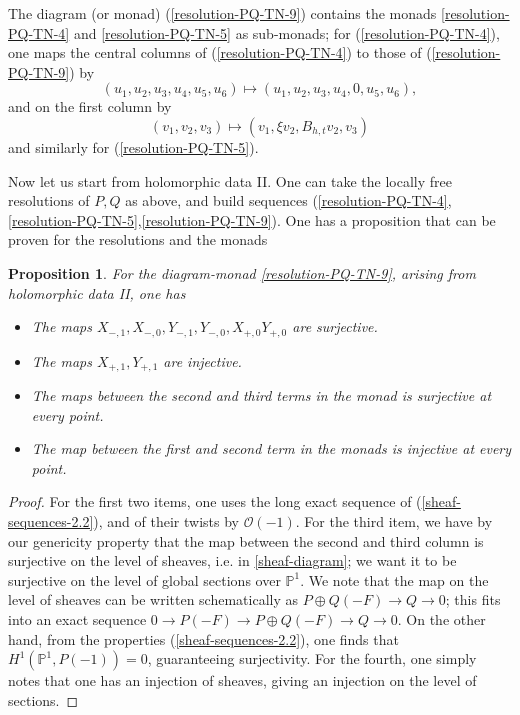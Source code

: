 \documentclass[12pt]{article}
\newtheorem{proposition}[theorem]{Proposition}
\theoremstyle{definition}
\theoremstyle{remark}
\numberwithin{theorem}{section}
\def\bP{{\mathbb {P}}}
\def\pO{{\mathcal O}}
\begin{document}
The diagram (or monad) (\ref{resolution-PQ-TN-9}) contains the monads \eqref{resolution-PQ-TN-4} and \eqref{resolution-PQ-TN-5} as sub-monads; 
for (\ref{resolution-PQ-TN-4}), one maps the central columns of (\ref{resolution-PQ-TN-4}) to those of (\ref{resolution-PQ-TN-9}) by 
$$(u_1, u_2, u_3, u_4,u_5, u_6)\mapsto (u_1, u_2, u_3 , u_4  , 0, u_5, u_6),$$
and on the first column by 
$$(v_1, v_2, v_3) \mapsto (v_1, \xi v_2, B_{h,t}v_2, v_3)$$
and  similarly for (\ref{resolution-PQ-TN-5}).  


Now let us start from   holomorphic data II. One can take the locally free resolutions of $P, Q$ as above, and build sequences (\ref{resolution-PQ-TN-4},\ref{resolution-PQ-TN-5},\ref{resolution-PQ-TN-9}).   One has a proposition that can be proven for the resolutions and the monads
\begin{proposition}\label{genericity-maps}
For the diagram-monad \eqref{resolution-PQ-TN-9}, arising from  holomorphic data II, one has
\begin{itemize}
\item{}The maps $X_{-,1}, X_{-,0}, Y_{-,1}, Y_{-,0}, X_{+, 0} Y_{+,0} $ are surjective.
\item{} The maps $X_{+,1}, Y_{+,1}$ are injective.
\item{} The maps between the second and third terms in the monad  is surjective at every point.
\item{} The map between the first and second term in the monads is injective at every point.
\end{itemize}
\end{proposition}
 
\begin{proof}
For the first two items, one uses the long exact sequence of (\ref{sheaf-sequences-2.2}), and of their twists by $\pO(-1)$. For the third item, we have by our genericity property that the map between the second and third column is surjective on the level of sheaves, i.e. in \eqref{sheaf-diagram}; we want it to be surjective on the level of global sections over $\bP^1$. We note that the map on the level of sheaves can be written schematically as $P\oplus Q(-F)\rightarrow Q\rightarrow 0$; this fits into an exact sequence $0\rightarrow P(-F)\rightarrow P\oplus Q(-F)\rightarrow Q\rightarrow 0$. On the other hand, from the properties (\ref{sheaf-sequences-2.2}), one finds that $H^1(\bP^1,P(-1)) = 0$, guaranteeing surjectivity. For the fourth, one simply notes that one has an injection of sheaves, giving an injection on the level of sections.\end{proof}
\end{document}
